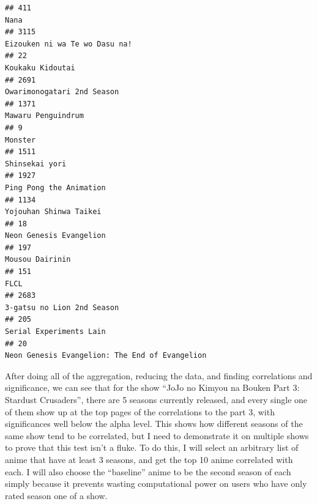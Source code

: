 \documentclass[
]{article}
\begin{document}
\begin{verbatim}
## 411                                                                                                       Nana
## 3115                                                                             Eizouken ni wa Te wo Dasu na!
## 22                                                                                            Koukaku Kidoutai
## 2691                                                                                Owarimonogatari 2nd Season
## 1371                                                                                        Mawaru Penguindrum
## 9                                                                                                      Monster
## 1511                                                                                            Shinsekai yori
## 1927                                                                                   Ping Pong the Animation
## 1134                                                                                    Yojouhan Shinwa Taikei
## 18                                                                                     Neon Genesis Evangelion
## 197                                                                                            Mousou Dairinin
## 151                                                                                                       FLCL
## 2683                                                                                3-gatsu no Lion 2nd Season
## 205                                                                                    Serial Experiments Lain
## 20                                                              Neon Genesis Evangelion: The End of Evangelion
\end{verbatim}

After doing all of the aggregation, reducing the data, and finding
correlations and significance, we can see that for the show ``JoJo no
Kimyou na Bouken Part 3: Stardust Crusaders'', there are 5 seasons
currently released, and every single one of them show up at the top
pages of the correlations to the part 3, with significances well below
the alpha level. This shows how different seasons of the same show tend
to be correlated, but I need to demonstrate it on multiple shows to
prove that this test isn't a fluke. To do this, I will select an
arbitrary list of anime that have at least 3 seasons, and get the top 10
anime correlated with each. I will also choose the ``baseline'' anime to
be the second season of each simply because it prevents wasting
computational power on users who have only rated season one of a show.
\end{document}
